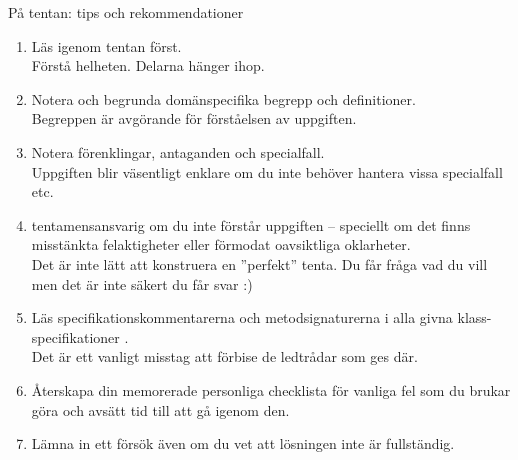 \documentclass{lecturenotes}
\begin{document}
\begin{Slide}{På tentan: tips och rekommendationer} \footnotesize
\begin{enumerate}
\item Läs igenom  tentan först. \\  Förstå helheten. Delarna hänger ihop.
\item Notera och begrunda domänspecifika begrepp och definitioner. \\  Begreppen är avgörande för förståelsen av uppgiften.
\item Notera förenklingar, antaganden och specialfall. \\  Uppgiften blir väsentligt enklare om du inte behöver hantera vissa specialfall etc.
\item {} tentamensansvarig om du inte förstår uppgiften -- speciellt om det finns misstänkta felaktigheter eller förmodat oavsiktliga oklarheter. \\  Det är inte lätt att konstruera en ''perfekt'' tenta. Du får fråga vad du vill men det är inte säkert du får svar :)
\item Läs specifikationskommentarerna och metodsignaturerna i alla givna klass-specifikationer . \\  Det är ett vanligt misstag att förbise de ledtrådar som ges där.
\item Återskapa din memorerade personliga checklista för vanliga fel som du brukar göra och avsätt tid till att gå igenom den.
\item Lämna in ett försök även om du vet att lösningen inte är fullständig. 
\end{enumerate}
\end{Slide}
\end{document}
